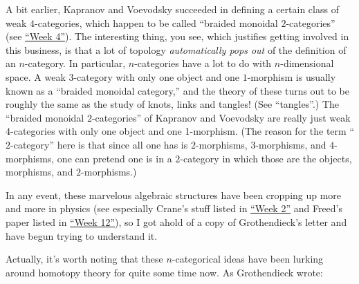 \documentclass[12pt]{article}
\begin{document}
A bit earlier, Kapranov and Voevodsky succeeded in defining a certain
class of weak \(4\)-categories, which happen to be called ``braided
monoidal \(2\)-categories'' (see \protect\hyperlink{week4}{``Week 4''}).
The interesting thing, you see, which justifies getting involved in this
business, is that a lot of topology \emph{automatically pops out} of the
definition of an \(n\)-category. In particular, \(n\)-categories have a
lot to do with \(n\)-dimensional space. A weak \(3\)-category with only
one object and one \(1\)-morphism is usually known as a ``braided
monoidal category,'' and the theory of these turns out to be roughly the
same as the study of knots, links and tangles! (See ``tangles''.) The
``braided monoidal \(2\)-categories'' of Kapranov and Voevodsky are
really just weak \(4\)-categories with only one object and one
1-morphism. (The reason for the term ``\(2\)-category'' here is that
since all one has is \(2\)-morphisms, \(3\)-morphisms, and
\(4\)-morphisms, one can pretend one is in a \(2\)-category in which
those are the objects, morphisms, and \(2\)-morphisms.)

In any event, these marvelous algebraic structures have been cropping up
more and more in physics (see especially Crane's stuff listed in
\protect\hyperlink{week2}{``Week 2''} and Freed's paper listed in
\protect\hyperlink{week12}{``Week 12''}), so I got ahold of a copy of
Grothendieck's letter and have begun trying to understand it.

Actually, it's worth noting that these \(n\)-categorical ideas have been
lurking around homotopy theory for quite some time now. As Grothendieck
wrote:
\end{document}
